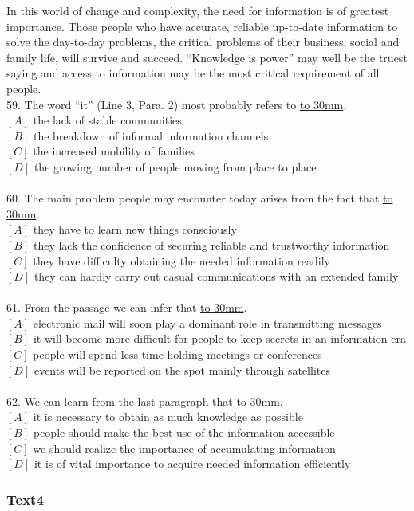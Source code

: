 \documentclass[a4paper]{article}
\begin{document}
\par
In this world of change and complexity, the need for information is of greatest importance. Those people who have accurate, reliable up-to-date information to solve the day-to-day problems, the critical problems of their business, social and family life, will survive and succeed. “Knowledge is power” may well be the truest saying and access to information may be the most critical requirement of all people.
\\59.	The word “it” (Line 3, Para. 2) most probably refers to \underline{\hbox to 30mm{}}.\\$[A]$ the lack of stable communities\\$[B]$ the breakdown of informal information channels\\$[C]$ the increased mobility of families\\$[D]$ the growing number of people moving from place to place\\\\60.	The main problem people may encounter today arises from the fact that \underline{\hbox to 30mm{}}.\\$[A]$ they have to learn new things consciously\\$[B]$ they lack the confidence of securing reliable and trustworthy information\\$[C]$ they have difficulty obtaining the needed information readily\\$[D]$ they can hardly carry out casual communications with an extended family\\\\61.	From the passage we can infer that \underline{\hbox to 30mm{}}.\\$[A]$ electronic mail will soon play a dominant role in transmitting messages\\$[B]$ it will become more difficult for people to keep secrets in an information era\\$[C]$ people will spend less time holding meetings or conferences\\$[D]$ events will be reported on the spot mainly through satellites\\\\62.	We can learn from the last paragraph that \underline{\hbox to 30mm{}}.\\$[A]$ it is necessary to obtain as much knowledge as possible\\$[B]$ people should make the best use of the information accessible\\$[C]$ we should realize the importance of accumulating information\\$[D]$ it is of vital importance to acquire needed information efficiently\\\subsubsection{Text4}
\end{document}

